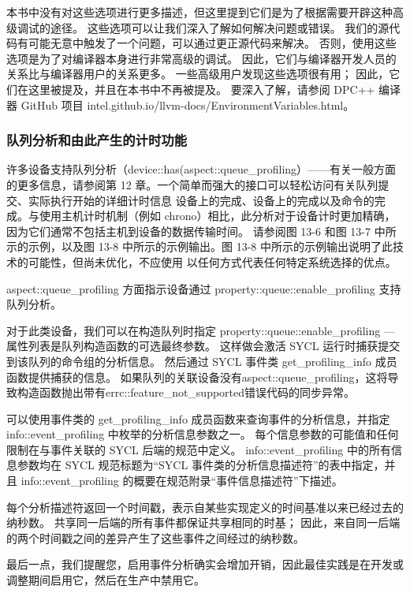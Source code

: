 本书中没有对这些选项进行更多描述，但这里提到它们是为了根据需要开辟这种高级调试的途径。 这些选项可以让我们深入了解如何解决问题或错误。 我们的源代码有可能无意中触发了一个问题，可以通过更正源代码来解决。 否则，使用这些选项是为了对编译器本身进行非常高级的调试。 因此，它们与编译器开发人员的关系比与编译器用户的关系更多。 一些高级用户发现这些选项很有用； 因此，它们在这里被提及，并且在本书中不再被提及。 要深入了解，请参阅 DPC++ 编译器 GitHub 项目 intel.github.io/llvm-docs/EnvironmentVariables.html。

\subsubsection{队列分析和由此产生的计时功能}
许多设备支持队列分析（device::has(aspect::queue\_profiling）——有关一般方面的更多信息，请参阅第 12 章。一个简单而强大的接口可以轻松访问有关队列提交、实际执行开始的详细计时信息 设备上的完成、设备上的完成以及命令的完成。与使用主机计时机制（例如 chrono）相比，此分析对于设备计时更加精确，因为它们通常不包括主机到设备的数据传输时间。 请参阅图 13-6 和图 13-7 中所示的示例，以及图 13-8 中所示的示例输出。图 13-8 中所示的示例输出说明了此技术的可能性，但尚未优化，不应使用 以任何方式代表任何特定系统选择的优点。

aspect::queue\_profiling 方面指示设备通过 property::queue::enable\_profiling 支持队列分析。

对于此类设备，我们可以在构造队列时指定 property::queue::enable\_profiling — 属性列表是队列构造函数的可选最终参数。 这样做会激活 SYCL 运行时捕获提交到该队列的命令组的分析信息。 然后通过 SYCL 事件类 get\_profiling\_info 成员函数提供捕获的信息。 如果队列的关联设备没有aspect::queue\_profiling，这将导致构造函数抛出带有errc::feature\_not\_supported错误代码的同步异常。

可以使用事件类的 get\_profiling\_info 成员函数来查询事件的分析信息，并指定 info::event\_profiling 中枚举的分析信息参数之一。 每个信息参数的可能值和任何限制在与事件关联的 SYCL 后端的规范中定义。 info::event\_profiling 中的所有信息参数均在 SYCL 规范标题为“SYCL 事件类的分析信息描述符”的表中指定，并且 info::event\_profiling 的概要在规范附录“事件信息描述符”下描述。

每个分析描述符返回一个时间戳，表示自某些实现定义的时间基准以来已经过去的纳秒数。 共享同一后端的所有事件都保证共享相同的时基； 因此，来自同一后端的两个时间戳之间的差异产生了这些事件之间经过的纳秒数。

最后一点，我们提醒您，启用事件分析确实会增加开销，因此最佳实践是在开发或调整期间启用它，然后在生产中禁用它。

